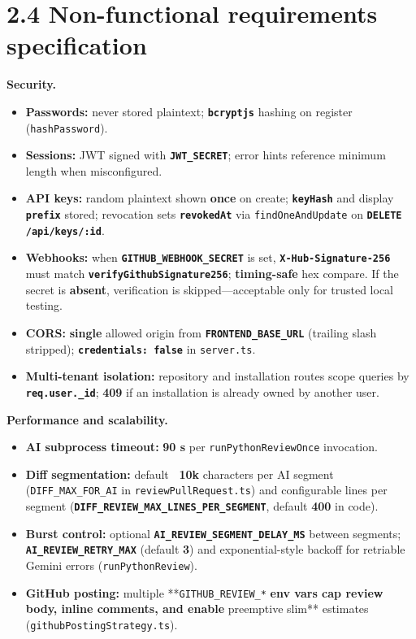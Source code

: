 \documentclass[11pt,a4paper]{report}
\begin{document}
\section{2.4 Non-functional requirements specification}


\textbf{Security.}


\begin{itemize}
\item \textbf{Passwords:} never stored plaintext; \textbf{\texttt{bcryptjs}} hashing on register (\texttt{hashPassword}).
\item \textbf{Sessions:} JWT signed with \textbf{\texttt{JWT\_SECRET}}; error hints reference minimum length when misconfigured.
\item \textbf{API keys:} random plaintext shown \textbf{once} on create; \textbf{\texttt{keyHash}} and display \textbf{\texttt{prefix}} stored; revocation sets \textbf{\texttt{revokedAt}} via \texttt{findOneAndUpdate} on \textbf{\texttt{DELETE /api/keys/:id}}.
\item \textbf{Webhooks:} when \textbf{\texttt{GITHUB\_WEBHOOK\_SECRET}} is set, \textbf{\texttt{X-Hub-Signature-256}} must match \textbf{\texttt{verifyGithubSignature256}}; \textbf{timing-safe} hex compare. If the secret is \textbf{absent}, verification is skipped—acceptable only for trusted local testing.
\item \textbf{CORS:} \textbf{single} allowed origin from \textbf{\texttt{FRONTEND\_BASE\_URL}} (trailing slash stripped); \textbf{\texttt{credentials: false}} in \texttt{server.ts}.
\item \textbf{Multi-tenant isolation:} repository and installation routes scope queries by \textbf{\texttt{req.user.\_id}}; \textbf{409} if an installation is already owned by another user.
\end{itemize}


\textbf{Performance and scalability.}


\begin{itemize}
\item \textbf{AI subprocess timeout:} \textbf{90 s} per \texttt{runPythonReviewOnce} invocation.
\item \textbf{Diff segmentation:} default \textbf{~10k} characters per AI segment (\texttt{DIFF\_MAX\_FOR\_AI} in \texttt{reviewPullRequest.ts}) and configurable lines per segment (\textbf{\texttt{DIFF\_REVIEW\_MAX\_LINES\_PER\_SEGMENT}}, default \textbf{400} in code).
\item \textbf{Burst control:} optional \textbf{\texttt{AI\_REVIEW\_SEGMENT\_DELAY\_MS}} between segments; \textbf{\texttt{AI\_REVIEW\_RETRY\_MAX}} (default \textbf{3}) and exponential-style backoff for retriable Gemini errors (\texttt{runPythonReview}).
\item \textbf{GitHub posting:} multiple **\texttt{GITHUB\_REVIEW\_*}\textbf{ env vars cap review body, inline comments, and enable }preemptive slim** estimates (\texttt{githubPostingStrategy.ts}).
\end{itemize}
\end{document}
